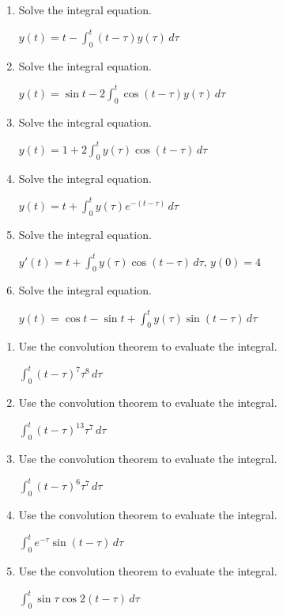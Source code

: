 \documentclass{ximera}
\begin{document}
\begin{problem}\label{exer:8.6.4}

\begin{enumerate}
\item Solve the integral equation.

$y(t)=t-\int_0^t (t-\tau)
y(\tau)\,d\tau$

\item Solve the integral equation.

$y(t)=\sin t-2
\int_0^t\cos (t-\tau) y (\tau)\,d\tau$

\item Solve the integral equation.

$y(t)=1+2
\int_0^ty(\tau)\cos(t-\tau)\,d\tau$

\item Solve the integral equation.

$y(t)=t+\int_0^t
y(\tau)e^{-(t-\tau)}\,d\tau$

\item Solve the integral equation. 

$y'(t)=t+\int_0^t y(\tau)\cos
(t-\tau)\,d\tau,\, y(0)=4$

\item Solve the integral equation.

$y(t)=\cos t-\sin t+
\int_0^t y(\tau)\sin (t-\tau)\,d\tau$

\end{enumerate}
\end{problem}

\begin{problem}\label{exer:8.6.5}

\begin{enumerate}

\item Use the convolution theorem to evaluate the integral.

$\int_0^t (t-\tau)^7\tau^8\,
d\tau$

\item Use the convolution theorem to evaluate the integral.

$\int_0^t(t-\tau)^{13}\tau^7\,d\tau$

\item Use the convolution theorem to evaluate the integral.

$\int_0^t(t-\tau)^6\tau^7\,
d\tau$

\item Use the convolution theorem to evaluate the integral.

$\int_0^te^{-\tau}\sin(t-\tau)\,d\tau$

\item Use the convolution theorem to evaluate the integral.

 $\int_0^t\sin\tau\cos2(t-\tau)\,d\tau$
\end{enumerate}
\end{problem}
\end{document}
